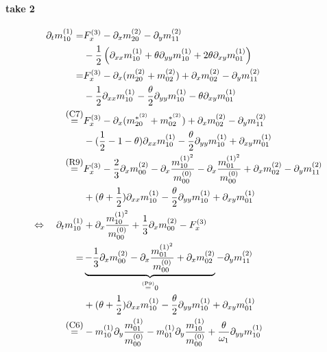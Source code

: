 \documentclass{article}
\begin{document}
\newpage
\paragraph{take 2}
\begin{align*}
  \partial_t m_{10}^{(1)}
    =&
    F_x^{(3)}
    - \partial_x m_{20}^{(2)} - \partial_y m_{11}^{(2)} \\
    &
    - \frac{1}{2} \left(\partial_{xx} m_{10}^{(1)} + \theta\partial_{yy} m_{10}^{(1)} + 2\theta\partial_{xy} m_{01}^{(1)}\right)
    \\=&
    F_x^{(3)}
    - \partial_x (m_{20}^{(2)} + m_{02}^{(2)}) + \partial_x m_{02}^{(2)} - \partial_y m_{11}^{(2)}
    \\ &
    - \frac{1}{2} \partial_{xx} m_{10}^{(1)} - \frac{\theta}{2}\partial_{yy} m_{10}^{(1)} - \theta\partial_{xy} m_{01}^{(1)}
    \\ \overset{\text{\small(C7)}}{=} &
    F_x^{(3)}
    - \partial_x (m_{20}^{*^{(2)}} + m_{02}^{*^{(2)}}) + \partial_x m_{02}^{(2)} - \partial_y m_{11}^{(2)}
    \\ &
    - (\frac{1}{2}-1-\theta) \partial_{xx} m_{10}^{(1)} - \frac{\theta}{2}\partial_{yy} m_{10}^{(1)} + \partial_{xy} m_{01}^{(1)}
    \\ \overset{\text{\small(R9)}}{=} &
    F_x^{(3)}
    - \frac{2}{3}\partial_x m_{00}^{(2)}
    - \partial_x \frac{ m_{10}^{{(1)}^2}}{ m_{00}^{(0)}}
    - \partial_x \frac{ m_{01}^{{(1)}^2}}{ m_{00}^{(0)}}
    + \partial_x m_{02}^{(2)} - \partial_y m_{11}^{(2)}
    \\ &
    + (\theta + \frac{1}{2}) \partial_{xx} m_{10}^{(1)} - \frac{\theta}{2}\partial_{yy} m_{10}^{(1)} + \partial_{xy} m_{01}^{(1)}
    \\\Leftrightarrow\quad   \partial_t m_{10}^{(1)} &
    + \partial_x \frac{ m_{10}^{{(1)}^2}}{ m_{00}^{(0)}}
    + \frac{1}{3}\partial_x m_{00}^{(2)}
    - F_x^{(3)}
    \\ = &
    \underbrace{- \frac{1}{3}\partial_x m_{00}^{(2)}
    - \partial_x \frac{ m_{01}^{{(1)}^2}}{ m_{00}^{(0)}}
    + \partial_x m_{02}^{(2)}}_{\overset{\text{\tiny(P9)}}{=} 0}
    - \partial_y m_{11}^{(2)}
    \\ &
    + (\theta + \frac{1}{2}) \partial_{xx} m_{10}^{(1)} - \frac{\theta}{2}\partial_{yy} m_{10}^{(1)} + \partial_{xy} m_{01}^{(1)}
    \\ \overset{\text{\small(C6)}}{=} &
    -m_{10}^{(1)}\partial_y \frac{ m_{01}^{(1)}}{m_{00}^{(0)}}
    -m_{01}^{(1)}\partial_y \frac{ m_{10}^{(1)}}{m_{00}^{(0)}}
    + \frac{\theta}{\omega_1}\partial_{yy} m_{10}^{(1)}

\end{align*}
\end{document}
